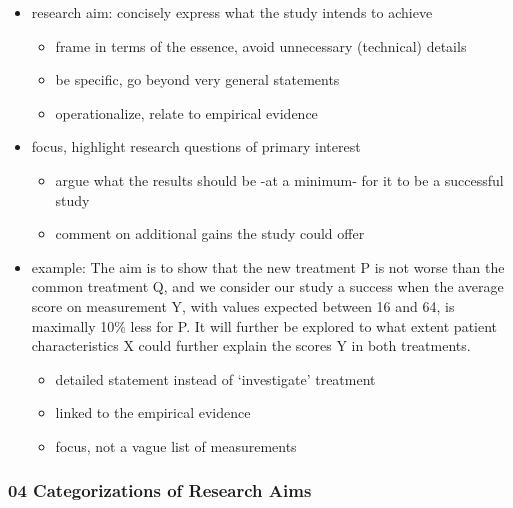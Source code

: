 \documentclass[
]{article}
\providecommand{\tightlist}{%
  \setlength{\itemsep}{0pt}\setlength{\parskip}{0pt}}
\begin{document}
\begin{itemize}
\tightlist
\item
  research aim: concisely express what the study intends to achieve

  \begin{itemize}
  \tightlist
  \item
    frame in terms of the essence, avoid unnecessary (technical) details
  \item
    be specific, go beyond very general statements
  \item
    operationalize, relate to empirical evidence \\
  \end{itemize}
\item
  focus, highlight research questions of primary interest

  \begin{itemize}
  \tightlist
  \item
    argue what the results should be -at a minimum- for it to be a
    successful study
  \item
    comment on additional gains the study could offer \\
  \end{itemize}
\item
  example: The aim is to show that the new treatment P is not worse than
  the common treatment Q, and we consider our study a success when the
  average score on measurement Y, with values expected between 16 and
  64, is maximally 10\% less for P. It will further be explored to what
  extent patient characteristics X could further explain the scores Y in
  both treatments.

  \begin{itemize}
  \tightlist
  \item
    detailed statement instead of `investigate' treatment
  \item
    linked to the empirical evidence
  \item
    focus, not a vague list of measurements
  \end{itemize}
\end{itemize}

\hypertarget{categorizations-of-research-aims}{%
\subsubsection{04 Categorizations of Research
Aims}\label{categorizations-of-research-aims}}
\end{document}
